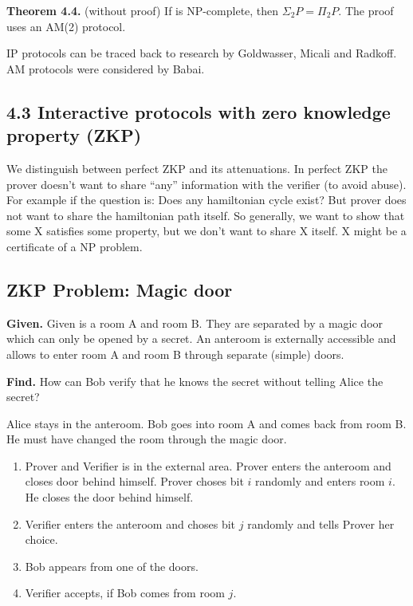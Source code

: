 \documentclass[a4paper]{article}
\newcommand{\given}[1]{\textbf{Given.} #1\par}
\newcommand{\find}[1]{\textbf{Find.} #1\par}
\newcommand{\cls}[1]{\rm{#1}}
\newcommand{\probl}[1]{\text{\textsc{#1}}}
\newenvironment{spec}[0]{\begin{framed}}{\end{framed}}
\begin{document}
\textbf{Theorem 4.4.} (without proof)
  If \probl{GI} is \cls{NP}-complete, then $\Sigma_2 P = \Pi_2 P$.
  The proof uses an AM(2) protocol.

\cls{IP} protocols can be traced back to research by Goldwasser, Micali and Radkoff.
\cls{AM} protocols were considered by Babai.

\subsection{4.3 Interactive protocols with zero knowledge property (ZKP)}
%
We distinguish between perfect ZKP and its attenuations. In perfect ZKP the prover
doesn't want to share ``any'' information with the verifier (to avoid abuse).
For example if the question is: Does any hamiltonian cycle exist? But prover
does not want to share the hamiltonian path itself. So generally, we want to
show that some X satisfies some property, but we don't want to share X itself.
X might be a certificate of a \cls{NP} problem.

\subsection{ZKP Problem: Magic door}
%
\begin{spec}
  \given{Given is a room A and room B. They are separated by a magic door
    which can only be opened by a secret. An anteroom is externally accessible and
    allows to enter room A and room B through separate (simple) doors.}
  \find{How can Bob verify that he knows the secret without telling Alice the secret?}
\end{spec}

Alice stays in the anteroom. Bob goes into room A and comes back from room B.
He must have changed the room through the magic door.

\begin{enumerate}
  \item Prover and Verifier is in the external area.
        Prover enters the anteroom and closes door behind himself.
        Prover choses bit $i$ randomly and enters room $i$. He closes
        the door behind himself.
  \item Verifier enters the anteroom and choses bit $j$ randomly
        and tells Prover her choice.
  \item Bob appears from one of the doors.
  \item Verifier accepts, if Bob comes from room $j$.
\end{enumerate}
\end{document}
